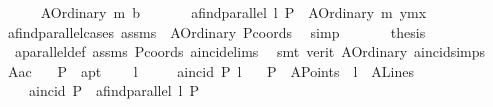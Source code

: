 \begin{isabellebody}
\isanewline
\ \ \ \ \isamarkupfalse%
\ {\isacharparenleft}{\kern0pt}A{}Ordinary\ m\ b{\isacharparenright}{\kern0pt}\isanewline
\ \ \ \ \isamarkupfalse%
\ {}{\isacharcolon}{\kern0pt}\ {\isachardoublequoteopen}a{}find{\isacharunderscore}{\kern0pt}parallel\ l\ P\ {\isacharequal}{\kern0pt}\ {\isacharparenleft}{\kern0pt}A{}Ordinary\ m\ {\isacharparenleft}{\kern0pt}y{}{\isacharminus}{\kern0pt}m{\isacharasterisk}{\kern0pt}x{}{\isacharparenright}{\kern0pt}{\isacharparenright}{\kern0pt}{\isachardoublequoteclose}\ \isamarkupfalse%
\ a{}find{\isacharunderscore}{\kern0pt}parallel{\isachardot}{\kern0pt}cases\ assms\ \ A{}Ordinary\ Pcoords\ \isamarkupfalse%
\ simp\ \isanewline
\ \ \ \ \isamarkupfalse%
\ {\isacharquery}{\kern0pt}thesis\ \isamarkupfalse%
\ {}\ a{}parallel{\isacharunderscore}{\kern0pt}def\ assms\ Pcoords\ a{}incid{\isachardot}{\kern0pt}elims\ \isamarkupfalse%
\ {\isacharparenleft}{\kern0pt}smt\ {\isacharparenleft}{\kern0pt}verit{\isacharparenright}{\kern0pt}\ A{}Ordinary\ a{}incid{\isachardot}{\kern0pt}simps{\isacharparenleft}{\kern0pt}{}{\isacharparenright}{\kern0pt}{\isacharparenright}{\kern0pt}\isanewline
\ \ \isamarkupfalse%
\isanewline
{}\isamarkupfalse%
%
\endisatagproof
{\isafoldproof}%
%
\isadelimproof
\isanewline
%
\endisadelimproof
\isanewline
{}\isamarkupfalse%
\ A{}{\isacharunderscore}{\kern0pt}a{}c{\isacharcolon}{\kern0pt}\isanewline
\ \ \ P\ {\isacharcolon}{\kern0pt}{\isacharcolon}{\kern0pt}\ a{}pt\ \isanewline
\ \ \ l\ \isanewline
\ \ \ {\isachardoublequoteopen}{\isasymnot}\ {\isacharparenleft}{\kern0pt}a{}incid\ P\ l{\isacharparenright}{\kern0pt}{\isachardoublequoteclose}\isanewline
\ \ \ {\isachardoublequoteopen}P\ {\isasymin}\ A{}Points{\isachardoublequoteclose}\ \ {\isachardoublequoteopen}l\ {\isasymin}\ A{}Lines{\isachardoublequoteclose}\ \isanewline
\ \ \ \ {\isachardoublequoteopen}a{}incid\ P\ \ {\isacharparenleft}{\kern0pt}a{}find{\isacharunderscore}{\kern0pt}parallel\ l\ P{\isacharparenright}{\kern0pt}{\isachardoublequoteclose}\ \isanewline
%
\isadelimproof

\end{isabellebody}
